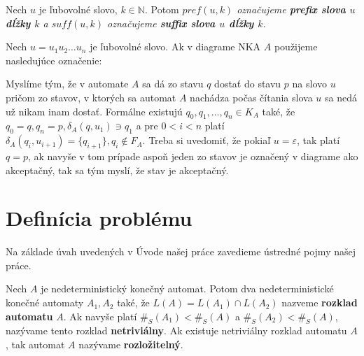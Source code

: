 \begin{notation}
Nech $ u $ je ľubovolné slovo, $ k \in \mathbb{N} $. Potom \em{}$ pref(u,k) $\em{} označujeme \textbf{prefix slova $ u $ dĺžky $ k $} a \em{}$ suff(u,k) $\em{} označujeme \textbf{suffix slova $ u $ dĺžky $ k $}.
\end{notation}

\begin{notation}
Nech $ u = u_1u_2 \ldots u_n$ je ľubovolné slovo. Ak v diagrame NKA $ A $ použijeme nasledujúce označenie:
\begin{figure}[H]
\centering
{}
\end{figure}

Myslíme tým, že v automate $ A $ sa dá zo stavu $ q $ dostať do stavu $ p $ na slovo $ u $ pričom zo stavov, v ktorých sa automat $ A $ nachádza počas čítania slova $ u $ sa nedá už nikam inam dostať. Formálne existujú $ q_0, q_1, \ldots, q_n \in K_A $ také, že $ q_0 = q, q_n = p, \delta_A(q, u_1) \ni q_1 $ a pre $ 0 < i < n $ platí $ \delta_A(q_i,u_{i+1}) = \lbrace q_{i+1} \rbrace, q_i \notin F_A $. Treba si uvedomiť, že pokiaľ $ u = \varepsilon $, tak platí $ q=p $, ak navyše v tom prípade aspoň jeden zo stavov je označený v diagrame ako akceptačný, tak sa tým myslí, že stav je akceptačný.
\end{notation}

\section{Definícia problému}
Na základe úvah uvedených v Úvode našej práce zavedieme ústredné pojmy našej práce.

\begin{definition}
Nech $ A $ je nedeterministický konečný automat. Potom dva nedeterministické konečné automaty $ A_1, A_2 $ také, že $ L(A)=L(A_1) \cap L(A_2) $ nazveme \textbf{rozklad automatu} $ A $. Ak navyše platí $ \#_S(A_1) < \#_S(A)$ a $ \#_S(A_2) < \#_S(A) $, nazývame tento rozklad \textbf{netriviálny}. Ak existuje netriviálny rozklad automatu $ A $, tak automat $ A $ nazývame \textbf{rozložitelný}.
\end{definition}

